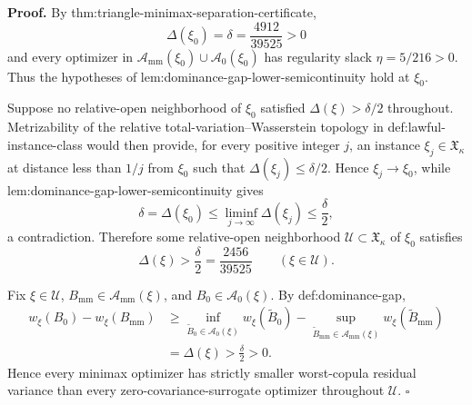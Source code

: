 \textbf{Proof.}
By thm:triangle-minimax-separation-certificate,
\[
 \Delta(\xi_0)=\delta=\frac{4912}{39525}>0
\]
and every optimizer in \(\mathcal A_{\mathrm{mm}}(\xi_0)\cup\mathcal A_0(\xi_0)\) has regularity slack \(\eta=5/216>0\).  Thus the hypotheses of lem:dominance-gap-lower-semicontinuity hold at \(\xi_0\).

Suppose no relative-open neighborhood of \(\xi_0\) satisfied \(\Delta(\xi)>\delta/2\) throughout.  Metrizability of the relative total-variation--Wasserstein topology in def:lawful-instance-class would then provide, for every positive integer \(j\), an instance \(\xi_j\in\mathfrak X_\kappa\) at distance less than \(1/j\) from \(\xi_0\) such that \(\Delta(\xi_j)\le\delta/2\).  Hence \(\xi_j\to\xi_0\), while lem:dominance-gap-lower-semicontinuity gives
\[
 \delta=\Delta(\xi_0)
 \le\liminf_{j\to\infty}\Delta(\xi_j)
 \le\frac{\delta}{2},
\]
a contradiction.  Therefore some relative-open neighborhood \(\mathcal U\subset\mathfrak X_\kappa\) of \(\xi_0\) satisfies
\[
 \Delta(\xi)>\frac{\delta}{2}=\frac{2456}{39525}
 \qquad(\xi\in\mathcal U).
\]

Fix \(\xi\in\mathcal U\), \(B_{\mathrm{mm}}\in\mathcal A_{\mathrm{mm}}(\xi)\), and \(B_0\in\mathcal A_0(\xi)\).  By def:dominance-gap,
\[
 \begin{split}
 w_\xi(B_0)-w_\xi(B_{\mathrm{mm}})
 &\ge
 \inf_{\widetilde B_0\in\mathcal A_0(\xi)}w_\xi(\widetilde B_0)
 -\sup_{\widetilde B_{\mathrm{mm}}\in\mathcal A_{\mathrm{mm}}(\xi)}
 w_\xi(\widetilde B_{\mathrm{mm}})\\
 &=\Delta(\xi)>\frac{\delta}{2}>0.
 \end{split}
\]
Hence every minimax optimizer has strictly smaller worst-copula residual variance than every zero-covariance-surrogate optimizer throughout \(\mathcal U\). \(\square\)